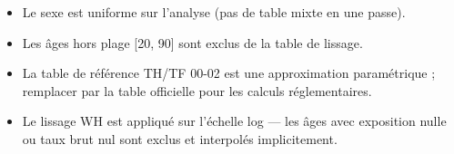 \documentclass[11pt,a4paper]{article}
\begin{document}
\begin{itemize}
  \item Le sexe est uniforme sur l'analyse (pas de table mixte en une passe).
  \item Les âges hors plage [20, 90] sont exclus de la table de lissage.
  \item La table de référence TH/TF 00-02 est une approximation paramétrique ;
        remplacer par la table officielle pour les calculs réglementaires.
  \item Le lissage WH est appliqué sur l'échelle log — les âges avec exposition
        nulle ou taux brut nul sont exclus et interpolés implicitement.
\end{itemize}
\end{document}
